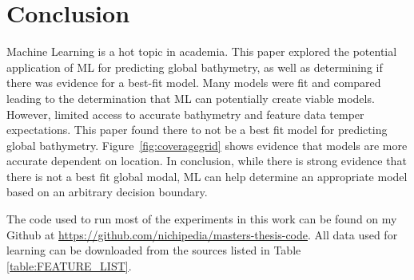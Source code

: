 \section{Conclusion}
\setlength{\parindent}{10ex}
Machine Learning is a hot topic in academia.
This paper explored the potential application of \ac{ML} for predicting global bathymetry, as well as determining if there was evidence for a best-fit model.
Many models were fit and compared leading to the determination that \ac{ML} can potentially create viable models.
However, limited access to accurate bathymetry and feature data temper expectations.
This paper found there to not be a best fit model for predicting global bathymetry. 
Figure~\ref{fig:coveragegrid} shows evidence that models are more accurate dependent on location.
In conclusion, while there is strong evidence that there is not a best fit global modal, \ac{ML} can help determine an appropriate model based on an arbitrary decision boundary.

\par
The code used to run most of the experiments in this work can be found on my Github at \url{https://github.com/nichipedia/masters-thesis-code}.
All data used for learning can be downloaded from the sources listed in Table \ref{table:FEATURE_LIST}.